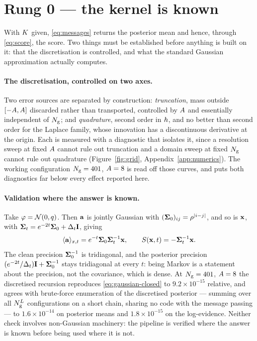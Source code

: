 \documentclass{article}
\theoremstyle{definition}
\theoremstyle{plain}
\begin{document}
\section{Rung 0 --- the kernel is known}
\label{sec:rung0}

With $K$ given, \eqref{eq:messages} returns the posterior mean and hence, through
\eqref{eq:score}, the score. Two things must be established before anything is built on it: that
the discretisation is controlled, and what the standard Gaussian approximation actually computes.

\paragraph{The discretisation, controlled on two axes.} Two error sources are separated by
construction: \emph{truncation}, mass outside $[-A,A]$ discarded rather than
transported, controlled by $A$ and essentially independent of $N_{\mathrm{g}}$; and
\emph{quadrature}, second order in $h$, and no better than second order for the Laplace
family, whose innovation has a discontinuous derivative at the origin. Each is measured with a
diagnostic that isolates it, since a resolution sweep at fixed $A$ cannot rule out
truncation and a domain sweep at fixed $N_{\mathrm{g}}$ cannot rule out quadrature
(Figure~\ref{fig:grid}, Appendix~\ref{app:numerics}). The working configuration $N_{\mathrm{g}}=401$,
$A=8$ is read off those curves, and puts both diagnostics far below every effect
reported here.

\paragraph{Validation where the answer is known.} Take $\varphi=\mathcal{N}\!\left(0,q\right)$. Then $\mathbf{a}$ is
jointly Gaussian with $(\mathbf{\Sigma}_0)_{ij}=\rho^{|i-j|}$, and so is $\mathbf{x}$, with
$\mathbf{\Sigma}_t = e^{-2t}\mathbf{\Sigma}_0 + \Delta_t \mathbf{I}$, giving
\begin{equation}
\label{eq:gaussian-closed}
\langle \mathbf{a} \rangle_{x,t} = e^{-t}\mathbf{\Sigma}_0\mathbf{\Sigma}_t^{-1}\mathbf{x},
\qquad
S(\mathbf{x},t) = -\mathbf{\Sigma}_t^{-1}\mathbf{x} .
\end{equation}
The clean precision $\mathbf{\Sigma}_0^{-1}$ is tridiagonal, and the posterior precision
$(e^{-2t}/\Delta_t)\mathbf{I} + \mathbf{\Sigma}_0^{-1}$ stays tridiagonal at every $t$: being Markov is a statement about
the precision, not the covariance, which is dense. At $N_{\mathrm{g}}=401$, $A=8$ the discretised
recursion reproduces \eqref{eq:gaussian-closed} to $9.2\times10^{-15}$ relative, and agrees with
brute-force enumeration of the discretised posterior --- summing over all $N_{\mathrm{g}}^{L}$
configurations on a short chain, sharing no code with the message passing --- to
$1.6\times10^{-14}$ on posterior means and $1.8\times10^{-15}$ on the log-evidence. Neither check
involves non-Gaussian machinery: the pipeline is verified where the answer is known before being
used where it is not.
\end{document}
